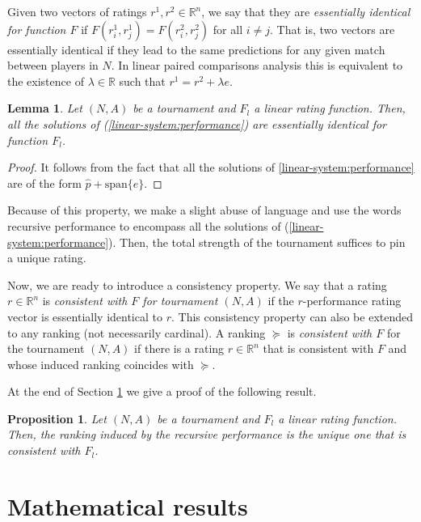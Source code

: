 \documentclass[a4paper,10pt]{article}
\newtheorem{lemma}[theorem]{Lemma}
\newtheorem{prop}[theorem]{Proposition}
\theoremstyle{remark}
\newcommand{\TM}{A} %
\newcommand{\rv}{r} %
\begin{document}
Given two vectors of ratings $\rv^1,\rv^2 \in \mathbb R^n$, we say
that they are \emph{essentially identical for function $F$} if
$F(\rv^1_i,\rv^1_j)=F(\rv^2_i,\rv^2_j)$ for all $i\neq j$. That
is, two vectors are essentially identical if they lead to the same
predictions for any given match between players in $N$. In linear
paired comparisons analysis this is equivalent to the existence of
$\lambda\in\mathbb{R}$ such that $r^1=r^2+\lambda e$.

\begin{lemma}
Let $(N,\TM)$ be a tournament and $F_l$ a linear rating function.
Then, all the solutions of (\ref{linear-system:performance}) are
essentially identical for function $F_l$.
\end{lemma}

\begin{proof}
It follows from the fact that all the solutions of
\eqref{linear-system:performance} are of the form
$\hat{p}+\text{span}\{e\}$.
\end{proof}

Because of this property, we make a slight abuse of language and
use the words recursive performance to encompass all the solutions
of (\ref{linear-system:performance}). Then, the total strength of
the tournament suffices to pin a unique rating.

Now, we are ready to introduce a consistency property. We say
that a rating $\rv\in \mathbb R^n$ is \emph{consistent with $F$
for tournament $(N,\TM)$} if the $\rv$-performance rating vector
is essentially identical to $\rv$. This consistency property can
also be extended to any ranking (not necessarily cardinal). A
ranking $\succeq$ is \emph{consistent with $F$} for the tournament
$(N,\TM)$ if there is a rating $\rv\in \mathbb R^n$ that is
consistent with $F$ and whose induced ranking coincides with
$\succeq$.

At the end of Section \ref{scMaths} we give a proof of the
following result.

\begin{prop}\label{thConsistency}
Let $(N,\TM)$ be a tournament and $F_l$ a linear rating function.
	Then, the ranking induced by the recursive performance is the
unique one that is consistent with $F_l$.
\end{prop}


\section{Mathematical results}\label{scMaths}
\end{document}
